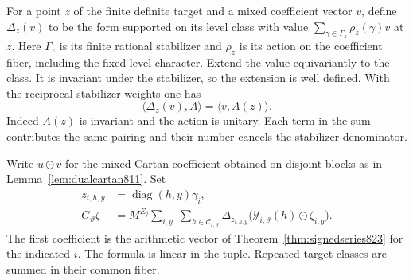 \documentclass[a4paper,11pt]{article}
\theoremstyle{definition}
\theoremstyle{remark}
\numberwithin{equation}{section}
\begin{document}
For a point \(z\) of the finite definite target and a mixed
coefficient vector \(v\), define \(\Delta_z(v)\) to be the form
supported on its level class with value
\(\sum_{\gamma\in\Gamma_z}\rho_z(\gamma)v\) at \(z\).
Here \(\Gamma_z\) is its finite rational stabilizer and \(\rho_z\)
is its action on the coefficient fiber, including the fixed level
character. Extend the value equivariantly to the class. It is
invariant under the stabilizer, so the extension is well defined.
With the reciprocal stabilizer weights one has
\[
          \langle\Delta_z(v),A\rangle
                        =\langle v,A(z)\rangle .
\]
Indeed \(A(z)\) is invariant and the action is unitary. Each term
in the sum contributes the same pairing and their number cancels
the stabilizer denominator.

Write \(u\odot v\) for the mixed Cartan coefficient obtained on
disjoint blocks as in Lemma~\ref{lem:dualcartan811}. Set
\[
 \begin{split}
 z_{i,h,y}&=\operatorname{diag}(h,y)\gamma_i,\\
 G_\vartheta\zeta
  &=M^{E_j}
    \sum_{i,y}\;\sum_{h\in\mathcal C_{i,\vartheta}}
       \Delta_{z_{i,h,y}}\bigl(
                \mathcal Y_{i,\vartheta}(h)\odot\zeta_{i,y}\bigr).
 \end{split}
\]
The first coefficient is the arithmetic vector of
Theorem~\ref{thm:signedseries823} for the indicated \(i\).
The formula is linear in the tuple. Repeated target classes are
summed in their common fiber.
\end{document}
